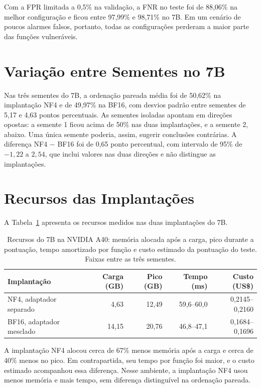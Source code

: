 Com a FPR limitada a 0,5\% na validação, a FNR no teste foi de 88,06\% na melhor configuração e ficou entre 97,99\% e 98,71\% no 7B. Em um cenário de poucos alarmes falsos, portanto, todas as configurações perderam a maior parte das funções vulneráveis.

\section{Variação entre Sementes no 7B}

Nas três sementes do 7B, a ordenação pareada média foi de 50,62\% na implantação NF4 e de 49,97\% na BF16, com desvios padrão entre sementes de 5,17 e 4,63 pontos percentuais. As sementes isoladas apontam em direções opostas: a semente 1 ficou acima de 50\% nas duas implantações, e a semente 2, abaixo. Uma única semente poderia, assim, sugerir conclusões contrárias. A diferença NF4 $-$ BF16 foi de 0,65 ponto percentual, com intervalo de 95\% de $-1{,}22$ a $2{,}54$, que inclui valores nas duas direções e não distingue as implantações.

\section{Recursos das Implantações}

A Tabela~\ref{tab:recursos} apresenta os recursos medidos nas duas implantações do 7B.

\begin{table}[H]
    \centering
    \caption{Recursos do 7B na NVIDIA A40: memória alocada após a carga, pico durante a pontuação, tempo amortizado por função e custo estimado da pontuação do teste. Faixas entre as três sementes.}
    \label{tab:recursos}
    \footnotesize
    \begin{tabular}{lrrrr}
        \toprule
        \textbf{Implantação} & \textbf{Carga (GB)} & \textbf{Pico (GB)} & \textbf{Tempo (ms)} & \textbf{Custo (US\$)} \\
        \midrule
        NF4, adaptador separado & 4,63 & 12,49 & 59,6--60,0 & 0,2145--0,2160 \\
        BF16, adaptador mesclado & 14,15 & 20,76 & 46,8--47,1 & 0,1684--0,1696 \\
        \bottomrule
    \end{tabular}
\end{table}

A implantação NF4 alocou cerca de 67\% menos memória após a carga e cerca de 40\% menos no pico. Em contrapartida, seu tempo por função foi maior, e o custo estimado acompanhou essa diferença. Nesse ambiente, a implantação NF4 usou menos memória e mais tempo, sem diferença distinguível na ordenação pareada.

